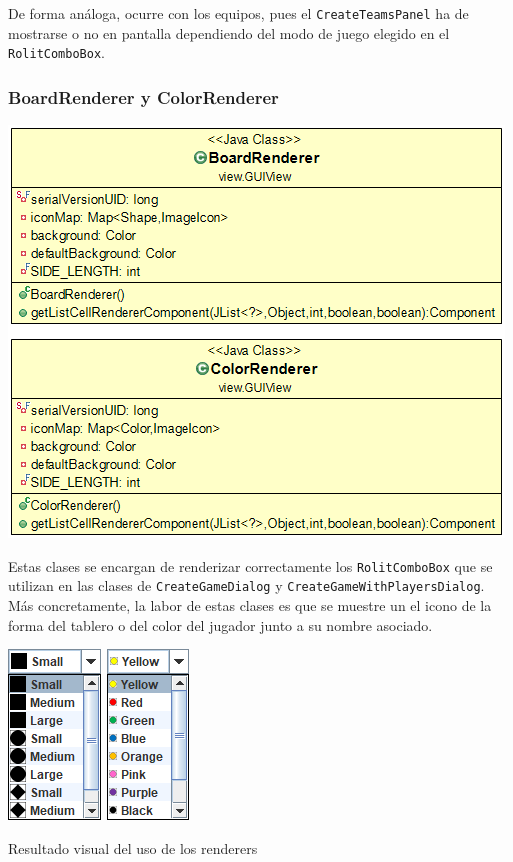 \documentclass[../DocumentoOficial.tex]{subfiles}
\begin{document}
De forma análoga, ocurre con los equipos, pues el \texttt{CreateTeamsPanel} ha de mostrarse o no en pantalla dependiendo del modo de juego elegido en el \texttt{RolitComboBox}.

\newpage

\subsubsection{BoardRenderer y ColorRenderer}
\begin{center}
\includegraphics[scale=0.5]{renderers.png}
\end{center}

Estas clases se encargan de renderizar correctamente los \texttt{RolitComboBox} que se utilizan en las clases de \texttt{CreateGameDialog} y \texttt{CreateGameWithPlayersDialog}. Más concretamente, la labor de estas clases es que se muestre un el icono de la forma del tablero o del color del jugador junto a su nombre asociado.

\begin{center}
\includegraphics[scale=1]{shapecombo.png}
\includegraphics[scale=1]{colorcombo.png}

Resultado visual del uso de los renderers
\end{center}
\end{document}
